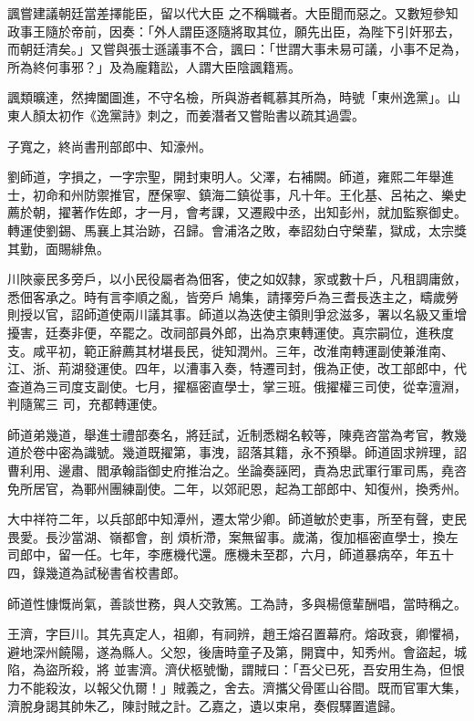 \begin{pinyinscope}
 諷嘗建議朝廷當差擇能臣，留以代大臣
 之不稱職者。大臣聞而惡之。又數短參知政事王隨於帝前，因奏：「外人謂臣逐隨將取其位，願先出臣，為陛下引奸邪去，而朝廷清矣。」又嘗與張士遜議事不合，諷曰：「世謂大事未易可議，小事不足為，所為終何事邪？」及為龐籍訟，人謂大臣陰諷籍焉。



 諷類曠達，然捭闔圖進，不守名檢，所與游者輒慕其所為，時號「東州逸黨」。山東人顏太初作《逸黨詩》刺之，而姜潛者又嘗貽書以疏其過雲。



 子寬之，終尚書刑部郎中、知濠州。



 劉師道，字損之，一字宗聖，開封東明人。父澤，右補闕。師道，雍熙二年舉進士，初命和州防禦推官，歷保寧、鎮海二鎮從事，凡十年。王化基、呂祐之、樂史薦於朝，擢著作佐郎，才一月，會考課，又遷殿中丞，出知彭州，就加監察御史。轉運使劉錫、馬襄上其治跡，召歸。會浦洛之敗，奉詔劾白守榮輩，獄成，太宗獎其勤，面賜緋魚。



 川陜豪民多旁戶，以小民役屬者為佃客，使之如奴隸，家或數十戶，凡租調庸斂，悉佃客承之。時有言李順之亂，皆旁戶
 鳩集，請擇旁戶為三耆長迭主之，疇歲勞則授以官，詔師道使兩川議其事。師道以為迭使主領則爭忿滋多，署以名級又重增擾害，廷奏非便，卒罷之。改祠部員外郎，出為京東轉運使。真宗嗣位，進秩度支。咸平初，範正辭薦其材堪長民，徙知潤州。三年，改淮南轉運副使兼淮南、江、浙、荊湖發運使。四年，以漕事入奏，特遷司封，俄為正使，改工部郎中，代查道為三司度支副使。七月，擢樞密直學士，掌三班。俄擢權三司使，從幸澶淵，判隨駕三
 司，充都轉運使。



 師道弟幾道，舉進士禮部奏名，將廷試，近制悉糊名較等，陳堯咨當為考官，教幾道於卷中密為識號。幾道既擢第，事洩，詔落其籍，永不預舉。師道固求辨理，詔曹利用、邊肅、閻承翰詣御史府推治之。坐論奏誣罔，責為忠武軍行軍司馬，堯咨免所居官，為鄆州團練副使。二年，以郊祀恩，起為工部郎中、知復州，換秀州。



 大中祥符二年，以兵部郎中知潭州，遷太常少卿。師道敏於吏事，所至有聲，吏民畏愛。長沙當湖、嶺都會，剖
 煩析滯，案無留事。歲滿，復加樞密直學士，換左司郎中，留一任。七年，李應機代還。應機未至郡，六月，師道暴病卒，年五十四，錄幾道為試秘書省校書郎。



 師道性慷慨尚氣，善談世務，與人交敦篤。工為詩，多與楊億輩酬唱，當時稱之。



 王濟，字巨川。其先真定人，祖卿，有祠辨，趙王熔召置幕府。熔政衰，卿懼禍，避地深州饒陽，遂為縣人。父恕，後唐時童子及第，開寶中，知秀州。會盜起，城陷，為盜所殺，將
 並害濟。濟伏柩號慟，謂賊曰：「吾父已死，吾安用生為，但恨力不能殺汝，以報父仇爾！」賊義之，舍去。濟攜父骨匿山谷間。既而官軍大集，濟脫身謁其帥朱乙，陳討賊之計。乙嘉之，遺以束帛，奏假驛置遣歸。




\end{pinyinscope}
